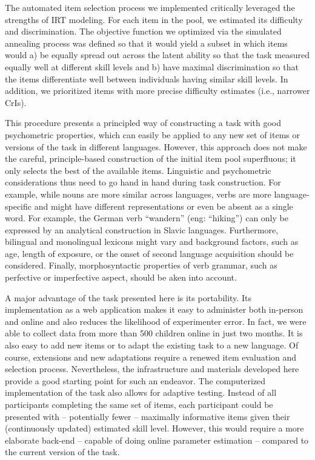 \documentclass[
  man,floatsintext]{apa6}
\begin{document}
The automated item selection process we implemented critically leveraged the strengths of IRT modeling. For each item in the pool, we estimated its difficulty and discrimination. The objective function we optimized via the simulated annealing process was defined so that it would yield a subset in which items would a) be equally spread out across the latent ability so that the task measured equally well at different skill levels and b) have maximal discrimination so that the items differentiate well between individuals having similar skill levels. In addition, we prioritized items with more precise difficulty estimates (i.e., narrower CrIs).

This procedure presents a principled way of constructing a task with good psychometric properties, which can easily be applied to any new set of items or versions of the task in different languages. However, this approach does not make the careful, principle-based construction of the initial item pool superfluous; it only selects the best of the available items. Linguistic and psychometric considerations thus need to go hand in hand during task construction. For example, while nouns are more similar across languages, verbs are more language-specific and might have different representations or even be absent as a single word. For example, the German verb ``wandern'' (eng: ``hiking'') can only be expressed by an analytical construction in Slavic languages. Furthermore, bilingual and monolingual lexicons might vary and background factors, such as age, length of exposure, or the onset of second language acquisition should be considered. Finally, morphosyntactic properties of verb grammar, such as perfective or imperfective aspect, should be aken into account.

A major advantage of the task presented here is its portability. Its implementation as a web application makes it easy to administer both in-person and online and also reduces the likelihood of experimenter error. In fact, we were able to collect data from more than 500 children online in just two months. It is also easy to add new items or to adapt the existing task to a new language. Of course, extensions and new adaptations require a renewed item evaluation and selection process. Nevertheless, the infrastructure and materials developed here provide a good starting point for such an endeavor. The computerized implementation of the task also allows for adaptive testing. Instead of all participants completing the same set of items, each participant could be presented with -- potentially fewer -- maximally informative items given their (continuously updated) estimated skill level. However, this would require a more elaborate back-end -- capable of doing online parameter estimation -- compared to the current version of the task.
\end{document}
